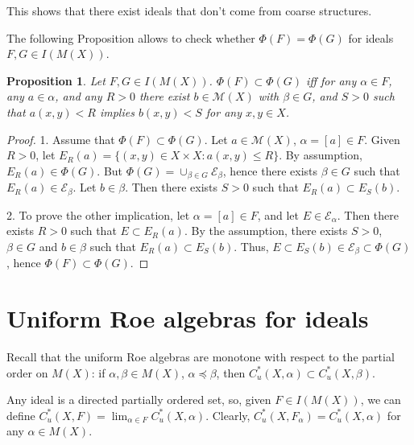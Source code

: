 \documentclass[reqno,12pt]{amsart}
\theoremstyle{plain}%
\newtheorem{prop}[thm]{Proposition}
\theoremstyle{definition}
\theoremstyle{remark}
\numberwithin{equation}{section}
\begin{document}
This shows that there exist ideals that don't come from coarse structures.

The following Proposition allows to check whether $\Phi(F)=\Phi(G)$ for ideals $F,G\in I(M(X))$.

\begin{prop}
Let $F,G\in I(M(X))$. $\Phi(F)\subset\Phi(G)$ iff for any $\alpha\in F$, any $a\in\alpha$, and any $R>0$ there exist $b\in\mathcal M(X)$ with $\beta\in G$, and $S>0$ such that $a(x,y)<R$ implies $b(x,y)<S$ for any $x,y\in X$. 

\end{prop}
\begin{proof}
1. Assume that $\Phi(F)\subset\Phi(G)$. Let $a\in\mathcal M(X)$, $\alpha=[a]\in F$. Given $R>0$, let $E_R(a)=\{(x,y)\in X\times X:a(x,y)\leq R\}$. By assumption, $E_R(a)\in\Phi(G)$. But $\Phi(G)=\cup_{\beta\in G}\mathcal E_\beta$, hence there exists $\beta\in G$ such that $E_R(a)\in \mathcal E_\beta$. Let $b\in\beta$. Then there exists $S>0$ such that $E_R(a)\subset E_S(b)$.

2. To prove the other implication, let $\alpha=[a]\in F$, and let $E\in\mathcal E_\alpha$. Then there exists $R>0$ such that $E\subset E_R(a)$. By the assumption, there exists $S>0$, $\beta\in G$ and $b\in\beta$ such that $E_R(a)\subset E_S(b)$. Thus, $E\subset E_S(b)\in\mathcal E_\beta\subset\Phi(G)$, hence $\Phi(F)\subset\Phi(G)$. 
\end{proof}



\section{Uniform Roe algebras for ideals}

Recall that the uniform Roe algebras are monotone with respect to the partial order on $M(X)$: if $\alpha,\beta\in M(X)$, $\alpha\preceq\beta$, then $C^*_u(X,\alpha)\subset C^*_u(X,\beta)$. 

Any ideal is a directed partially ordered set, so, given $F\in I(M(X))$, we can define $C^*_u(X,F)=\lim_{\alpha\in F}C^*_u(X,\alpha)$. Clearly, $C^*_u(X,F_\alpha)=C^*_u(X,\alpha)$ for any $\alpha\in M(X)$.
\end{document}
